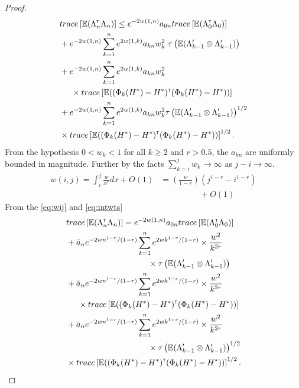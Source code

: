 \begin{proof}
\begin{align}
 & trace \left[\mathbb{E} (\Lambda_n ^\mathsf{\scriptscriptstyle T} \Lambda_n)\right] \leq e^{-2 w(1,n)} a_{0n} trace \left[\mathbb{E} (\Lambda_0 ^\mathsf{\scriptscriptstyle T} \Lambda_0)\right]  \nonumber\\ &+ e^{-2 w(1,n)} \sum_{k=1}^n e^{2 w(1,k)} a_{kn} w_k^2  \,\,\tau\left(\mathbb{E} (\Lambda_{k-1}' \otimes \Lambda_{k-1}')\right)  \nonumber\\ &+ e^{-2 w(1,n)} \sum_{k=1}^n e^{2 w(1,k)} a_{kn} w_k^2  \nonumber\\&  \hspace{0.5cm}\times trace\left[\mathbb{E} ((\Phi_k(H^*) - H^*) ^\mathsf{\scriptscriptstyle T}  (\Phi_k(H^*) - H^*))\right] \nonumber\\ &+ e^{-2 w(1,n)} \sum_{k=1}^n e^{2 w(1,k)} a_{kn} w_k^2  \tau\left(\mathbb{E} (\Lambda_{k-1}' \otimes \Lambda_{k-1}')\right)^{1/2} \nonumber\\&  \times trace\left[\mathbb{E} ((\Phi_k(H^*) - H^*) ^\mathsf{\scriptscriptstyle T}  (\Phi_k(H^*) - H^*))\right]^{1/2}.
 \end{align} 
From the hypothesis $0 < w_k < 1$ for all $k \geq 2$ and $r > 0.5$, the $a_{kn}$ are uniformly bounded in magnitude. Further by the facts $\sum_{k=i}^j w_k \to \infty$ as $j-i \to \infty$.
\begin{align}\label{eq:intwts}
w(i,j) = \int_i^j \frac{w}{x^r} dx + O(1) &= \left(\frac{w}{1-r}\right)(j^{1-r}-i^{1-r})\nonumber\\ &\hspace{2cm}+O(1)
\end{align}
From the \eqref{eq:wij} and \eqref{eq:intwts}
\begin{align}\label{eq:thmwts}
 & trace \left[\E (\Lambda_n \tr \Lambda_n)\right] =  e^{-2 w(1,n)} a_{0n} trace \left[\E (\Lambda_0 \tr \Lambda_0)\right]  \nonumber\\ &+ \bar a_n e^{-2 w n^{1-r}/(1-r)} \sum_{k=1}^n e^{2 w k^{1-r}/(1-r)}  \times \frac{w^2}{k^{2 r}} \nonumber\\& \hspace{3.5cm} \times \tau\left(\E (\Lambda_{k-1}' \otimes \Lambda_{k-1}')\right)  \nonumber\\ &+ \bar a_n e^{-2 w n^{1-r}/(1-r)} \sum_{k=1}^n e^{2 w k^{1-r}/(1-r)}  \times \frac{w^2}{k^{2 r}}  \nonumber\\&  \hspace{0.5cm}\times trace\left[\E ((\Phi_k(H^*) - H^*) \tr  (\Phi_k(H^*) - H^*))\right] \nonumber\\ &+ \bar a_n e^{-2 w n^{1-r}/(1-r)} \sum_{k=1}^n e^{2 w k^{1-r}/(1-r)}  \times \frac{w^2}{k^{2 r}}  \nonumber\\&\hspace{3.5cm}\times \tau\left(\E (\Lambda_{k-1}' \otimes \Lambda_{k-1}')\right)^{1/2}\nonumber\\&\times trace\left[\E ((\Phi_k(H^*) - H^*) \tr  (\Phi_k(H^*) - H^*))\right]^{1/2}.

\end{align}
\end{proof}
